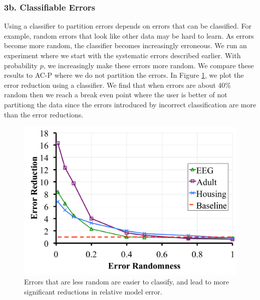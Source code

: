 \subsubsection{3b. Classifiable Errors}
Using a classifier to partition errors depends on errors that can be classified.
For example, random errors that look like other data may be hard to learn.
As errors become more random, the classifier becomes increasingly erroneous.
We run an experiment where we start with the systematic errors described earlier.
With probability $p$, we increasingly make these errors more random.
We compare these results to AC-P where we do not partition the errors.
In Figure \ref{tradeoffs2}, we plot the error reduction using a classifier.
We find that when errors are about 40\% random then we reach a break even point
where the user is better of not partitiong the data since the errors introduced by incorrect classification are more than the error reductions.

\begin{figure}[ht!]
\centering
 \includegraphics[scale=0.13]{exp/exp5a.pdf}
 \caption{Errors that are less random are easier to classify, and lead to more significant reductions in relative model error. \label{tradeoffs2}}
\end{figure}

